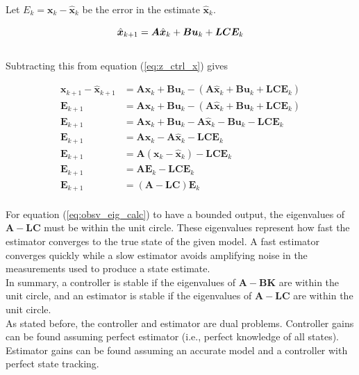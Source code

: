 \documentclass[10pt,conference,compsoc]{IEEEtran}
\newcommand{\mtx}[1] {\bm #1}
\begin{document}
\noindent Let $E_k = \mtx{x}_k - \hat{\mtx{x}}_k$ be the error in the estimate
$\hat{\mtx{x}}_k$.

\begin{equation*}
  \hat{\mtx{x}}_{k+1} = \mtx{A}\hat{\mtx{x}}_k + \mtx{B}\mtx{u}_k +
    \mtx{L}\mtx{C}\mtx{E}_k \\
\end{equation*}
\\
\noindent Subtracting this from equation (\ref{eq:z_ctrl_x}) gives

\begin{align}
  \mtx{x}_{k+1} - \hat{\mtx{x}}_{k+1} &= \mtx{A}\mtx{x}_k + \mtx{B}\mtx{u}_k -
    (\mtx{A}\hat{\mtx{x}}_k + \mtx{B}\mtx{u}_k +
     \mtx{L}\mtx{C}\mtx{E}_k) \nonumber \\
  \mtx{E}_{k+1} &= \mtx{A}\mtx{x}_k + \mtx{B}\mtx{u}_k -
    (\mtx{A}\hat{\mtx{x}}_k + \mtx{B}\mtx{u}_k + \mtx{L}\mtx{C}\mtx{E}_k)
    \nonumber \\
  \mtx{E}_{k+1} &= \mtx{A}\mtx{x}_k + \mtx{B}\mtx{u}_k -
    \mtx{A}\hat{\mtx{x}}_k - \mtx{B}\mtx{u}_k - \mtx{L}\mtx{C}\mtx{E}_k
    \nonumber \\
  \mtx{E}_{k+1} &= \mtx{A}\mtx{x}_k - \mtx{A}\hat{\mtx{x}}_k -
    \mtx{L}\mtx{C}\mtx{E}_k \nonumber \\
  \mtx{E}_{k+1} &= \mtx{A}(\mtx{x}_k - \hat{\mtx{x}}_k) -
    \mtx{L}\mtx{C}\mtx{E}_k \nonumber \\
  \mtx{E}_{k+1} &= \mtx{A}\mtx{E}_k - \mtx{L}\mtx{C}\mtx{E}_k \nonumber \\
  \mtx{E}_{k+1} &= (\mtx{A} - \mtx{L}\mtx{C})\mtx{E}_k \label{eq:obsv_eig_calc}
\end{align}
\\
\noindent For equation (\ref{eq:obsv_eig_calc}) to have a bounded output, the
eigenvalues of $\mtx{A} - \mtx{L}\mtx{C}$ must be within the unit circle. These
eigenvalues represent how fast the estimator converges to the true state of the
given model. A fast estimator converges quickly while a slow estimator avoids
amplifying noise in the measurements used to produce a state estimate. \\

\noindent In summary, a controller is stable if the eigenvalues of
$\mtx{A} - \mtx{B}\mtx{K}$ are within the unit circle, and an estimator is
stable if the eigenvalues of $\mtx{A} - \mtx{L}\mtx{C}$ are within the unit
circle. \\

\noindent As stated before, the controller and estimator are dual problems.
Controller gains can be found assuming perfect estimator (i.e., perfect
knowledge of all \glspl{state}). Estimator gains can be found assuming an
accurate model and a controller with perfect \gls{state tracking}.
\end{document}
